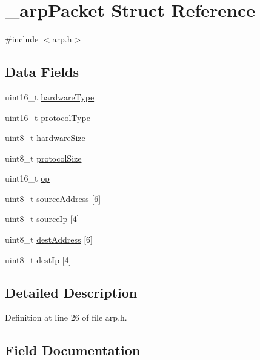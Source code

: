 \hypertarget{struct__arpPacket}{}\section{\+\_\+arp\+Packet Struct Reference}
\label{struct__arpPacket}


{\ttfamily \#include $<$arp.\+h$>$}

\subsection*{Data Fields}
\begin{DoxyCompactItemize}
\item 
uint16\+\_\+t \hyperlink{struct__arpPacket_a839c94f50cb7173a20785682e441d948}{hardware\+Type}
\item 
uint16\+\_\+t \hyperlink{struct__arpPacket_afad7356bbce2b911d8f6826872101e77}{protocol\+Type}
\item 
uint8\+\_\+t \hyperlink{struct__arpPacket_a722bf3490b264b96540b94863c6a027d}{hardware\+Size}
\item 
uint8\+\_\+t \hyperlink{struct__arpPacket_a5815bf18c947bc861ea70ac189ebd64f}{protocol\+Size}
\item 
uint16\+\_\+t \hyperlink{struct__arpPacket_a6505d582c64aaa66531903b7b1677b51}{op}
\item 
uint8\+\_\+t \hyperlink{struct__arpPacket_a2a92f5a13faefe488167039dba870ac6}{source\+Address} \mbox{[}6\mbox{]}
\item 
uint8\+\_\+t \hyperlink{struct__arpPacket_ac403f730ac761759e99f7896c396b5d7}{source\+Ip} \mbox{[}4\mbox{]}
\item 
uint8\+\_\+t \hyperlink{struct__arpPacket_a3c346f5b5af88ebe57adf3af73561fd4}{dest\+Address} \mbox{[}6\mbox{]}
\item 
uint8\+\_\+t \hyperlink{struct__arpPacket_aff29f4d16913664389e708a89eb40510}{dest\+Ip} \mbox{[}4\mbox{]}
\end{DoxyCompactItemize}


\subsection{Detailed Description}


Definition at line 26 of file arp.\+h.



\subsection{Field Documentation}
\mbox{\label{struct__arpPacket_a3c346f5b5af88ebe57adf3af73561fd4}} 
